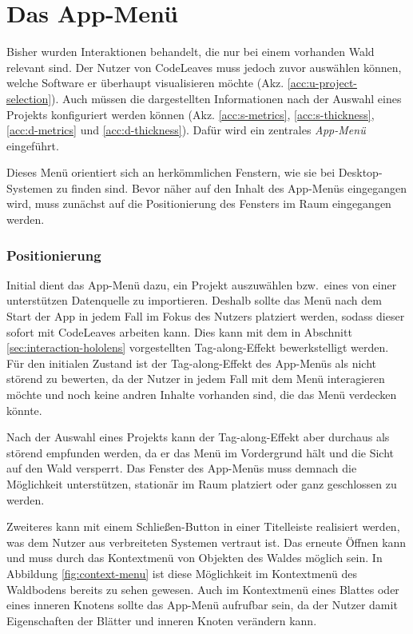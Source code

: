 \section{Das App-Menü}
\label{sec:app-menu}

Bisher wurden Interaktionen behandelt, die nur bei einem vorhanden Wald relevant sind. Der Nutzer von CodeLeaves muss jedoch zuvor auswählen können, welche Software er überhaupt visualisieren möchte (Akz. \ref{acc:u-project-selection}). Auch müssen die dargestellten Informationen nach der Auswahl eines Projekts konfiguriert werden können (Akz. \ref{acc:s-metrics}, \ref{acc:s-thickness}, \ref{acc:d-metrics} und \ref{acc:d-thickness}). Dafür wird ein zentrales \textit{App-Menü} eingeführt.

Dieses Menü orientiert sich an herkömmlichen Fenstern, wie sie bei Desktop-Systemen zu finden sind. Bevor näher auf den Inhalt des App-Menüs eingegangen wird, muss zunächst auf die Positionierung des Fensters im Raum eingegangen werden.

\subsubsection*{Positionierung}

Initial dient das App-Menü dazu, ein Projekt auszuwählen bzw.\ eines von einer unterstützen Datenquelle zu importieren. Deshalb sollte das Menü nach dem Start der App in jedem Fall im Fokus des Nutzers platziert werden, sodass dieser sofort mit CodeLeaves arbeiten kann. Dies kann mit dem in Abschnitt \ref{sec:interaction-hololens} vorgestellten Tag-along-Effekt bewerkstelligt werden. Für den initialen Zustand ist der Tag-along-Effekt des App-Menüs als nicht störend zu bewerten, da der Nutzer in jedem Fall mit dem Menü interagieren möchte und noch keine andren Inhalte vorhanden sind, die das Menü verdecken könnte.

Nach der Auswahl eines Projekts kann der Tag-along-Effekt aber durchaus als störend empfunden werden, da er das Menü im Vordergrund hält und die Sicht auf den Wald versperrt. Das Fenster des App-Menüs muss demnach die Möglichkeit unterstützen, stationär im Raum platziert oder ganz geschlossen zu werden.

Zweiteres kann mit einem Schließen-Button in einer Titelleiste realisiert werden, was dem Nutzer aus verbreiteten Systemen vertraut ist. Das erneute Öffnen kann und muss durch das Kontextmenü von Objekten des Waldes möglich sein. In Abbildung \ref{fig:context-menu} ist diese Möglichkeit im Kontextmenü des Waldbodens bereits zu sehen gewesen. Auch im Kontextmenü eines Blattes oder eines inneren Knotens sollte das App-Menü aufrufbar sein, da der Nutzer damit Eigenschaften der Blätter und inneren Knoten verändern kann.

